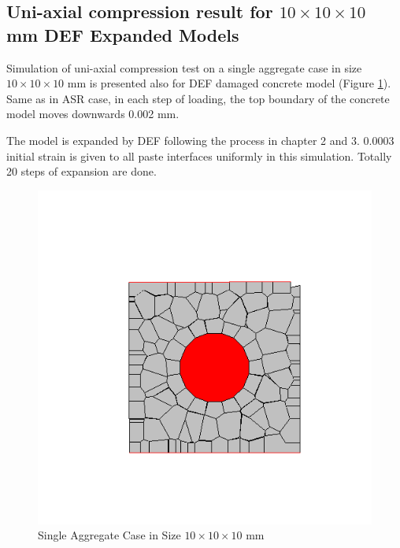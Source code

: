 \subsection{Uni-axial compression result for $10 \times 10 \times 10$ mm DEF Expanded Models}

Simulation of uni-axial compression test on a single aggregate case in size $10 \times 10 \times 10$ mm is presented also for DEF damaged concrete model (Figure \ref{cdefsma}). Same as in ASR case, in each step of loading, the top boundary of the concrete model moves downwards 0.002 mm.

The model is expanded by DEF following the process in chapter 2 and 3. 0.0003 initial strain is given to all paste interfaces uniformly in this simulation. Totally 20 steps of expansion are done.


\begin{figure}[h!]
\centering
\includegraphics[width=0.4\linewidth]{Files/Small_DEF/CR/DEP5-STEP(001).png}
\caption{Single Aggregate Case in Size $10 \times 10 \times 10$ mm}
\label{cdefsma}
\end{figure}

